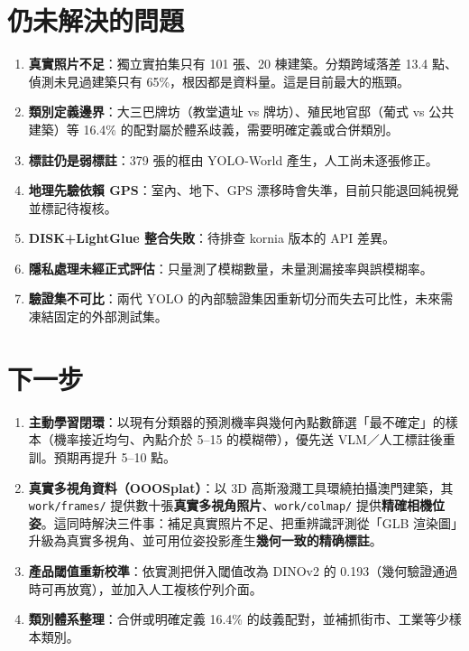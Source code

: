\documentclass[11pt,a4paper,fontset=windows]{ctexart}
\begin{document}
\section{仍未解決的問題}

\begin{enumerate}[leftmargin=1.4em,itemsep=2pt]
  \item \textbf{真實照片不足}：獨立實拍集只有 101 張、20 棟建築。分類跨域落差 13.4 點、偵測未見過建築只有 65\%，根因都是資料量。這是目前最大的瓶頸。
  \item \textbf{類別定義邊界}：大三巴牌坊（教堂遺址 vs 牌坊）、殖民地官邸（葡式 vs 公共建築）等 16.4\% 的配對屬於體系歧義，需要明確定義或合併類別。
  \item \textbf{標註仍是弱標註}：379 張的框由 YOLO-World 產生，人工尚未逐張修正。
  \item \textbf{地理先驗依賴 GPS}：室內、地下、GPS 漂移時會失準，目前只能退回純視覺並標記待複核。
  \item \textbf{DISK+LightGlue 整合失敗}：待排查 kornia 版本的 API 差異。
  \item \textbf{隱私處理未經正式評估}：只量測了模糊數量，未量測漏接率與誤模糊率。
  \item \textbf{驗證集不可比}：兩代 YOLO 的內部驗證集因重新切分而失去可比性，未來需凍結固定的外部測試集。
\end{enumerate}

\section{下一步}

\begin{enumerate}[leftmargin=1.4em,itemsep=2pt]
  \item \textbf{主動學習閉環}：以現有分類器的預測機率與幾何內點數篩選「最不確定」的樣本（機率接近均勻、內點介於 5--15 的模糊帶），優先送 VLM／人工標註後重訓。預期再提升 5--10 點。
  \item \textbf{真實多視角資料（OOOSplat）}：以 3D 高斯潑濺工具環繞拍攝澳門建築，其 \texttt{work/frames/} 提供數十張\textbf{真實多視角照片}、\texttt{work/colmap/} 提供\textbf{精確相機位姿}。這同時解決三件事：補足真實照片不足、把重辨識評測從「GLB 渲染圖」升級為真實多視角、並可用位姿投影產生\textbf{幾何一致的精确標註}。
  \item \textbf{產品閾值重新校準}：依實測把併入閾值改為 DINOv2 的 0.193（幾何驗證通過時可再放寬），並加入人工複核佇列介面。
  \item \textbf{類別體系整理}：合併或明確定義 16.4\% 的歧義配對，並補抓街市、工業等少樣本類別。
\end{enumerate}
\end{document}
